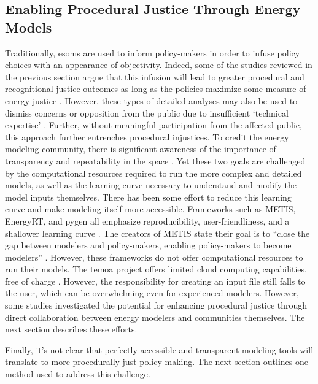 \subsection{Enabling Procedural Justice Through Energy Models}

Traditionally, \acp{esom} are used to inform policy-makers \cite{li_open_2020}
in order to infuse policy choices with an appearance of objectivity. Indeed,
some of the studies reviewed in the previous section argue that this infusion
will lead to greater procedural and recognitional justice outcomes as long as
the policies maximize some measure of energy justice
\cite{chapman_prioritizing_2018, heffron_resolving_2015}. However, these types
of detailed analyses may also be used to dismiss concerns or opposition from the
public due to insufficient `technical expertise' \cite{johnson_dakota_2021}.
Further, without meaningful participation from the affected public, this
approach further entrenches procedural injustices. To credit the energy modeling
community, there is significant awareness of the importance of transparency and
repeatability in the space \cite{decarolis_case_2012, pfenninger_energy_2014,
pfenninger_openmod_2022, forster_open_2022, hilpert_open_2018}. Yet these two
goals are challenged by the computational resources required to run the more
complex and detailed models, as well as the learning curve necessary to
understand and modify the model inputs themselves. There has been some effort to
reduce this learning curve and make modeling itself more accessible. Frameworks
such as METIS, EnergyRT, and \ac{pygen} all emphasize reproducibility,
user-friendliness, and a shallower learning curve \cite{sakellaris_metis_2018,
lugovoy_energyrt_2022, dotson_python_2021}. The creators of METIS state their
goal is to ``close the gap between modelers and policy-makers, enabling
policy-makers to become modelers'' \cite{sakellaris_metis_2018}. However, these
frameworks do not offer computational resources to run their models. The
\ac{temoa} project offers limited cloud computing capabilities, free of charge
\cite{temoa_project_temoa_2023}. However, the responsibility for creating an
input file still falls to the user, which can be overwhelming even for
experienced modelers. However, some studies investigated the potential for
enhancing procedural justice through direct collaboration between energy
modelers and communities themselves. The next section describes these efforts.


Finally, it's not clear that perfectly accessible and transparent modeling tools
will translate to more procedurally just policy-making. The next section
outlines one method used to address this challenge.


